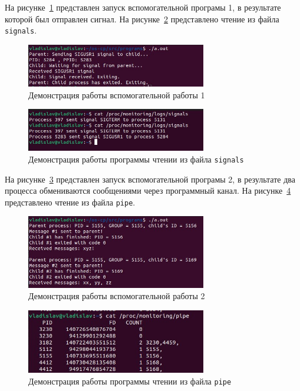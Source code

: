 На рисунке~\ref{img:program-signal} представлен запуск вспомогательной програмы 1, в результате которой был отправлен сигнал. 
На рисунке~\ref{img:example-signal} представлено чтение из файла \texttt{signals}.

\begin{figure}[h]
	\centering
	\includegraphics[width=0.7\textwidth]{img/program-signal}
	\caption{Демонстрация работы вспомогательной работы 1}
	\label{img:program-signal}
\end{figure}

\begin{figure}[h]
	\centering
	\includegraphics[width=0.7\textwidth]{img/example-signal}
	\caption{Демонстрация работы программы чтении из файла \texttt{signals}}
	\label{img:example-signal}
\end{figure}

\clearpage

На рисунке~\ref{img:program-pipe} представлен запуск вспомогательной програмы 2, в результате два процесса обмениваются сообщениями через программный канал. 
На рисунке~\ref{img:example-pipe} представлено чтение из файла \texttt{pipe}.

\begin{figure}[h]
	\centering
	\includegraphics[width=0.7\textwidth]{img/program-pipe}
	\caption{Демонстрация работы вспомогательной работы 2}
	\label{img:program-pipe}
\end{figure}

\begin{figure}[h]
	\centering
	\includegraphics[width=0.7\textwidth]{img/example-pipe}
	\caption{Демонстрация работы программы чтении из файла \texttt{pipe}}
	\label{img:example-pipe}
\end{figure}

